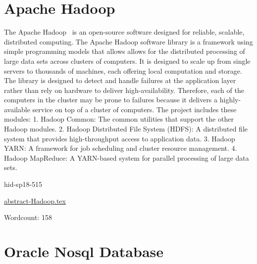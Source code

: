 \section{Apache Hadoop}

The Apache Hadoop~\cite{hid-sp18-515-www-hadoop} is an open-source 
software designed for reliable, scalable, distributed computing. 
The Apache Hadoop software library is a framework using simple programming 
models that allows allows for the distributed processing of large data sets across clusters of computers.
It is designed to scale up from single servers to thousands of machines, 
each offering local computation and storage.
The library is designed to detect and handle failures at the application 
layer rather than rely on hardware to deliver high-availability.
Therefore, each of the computers in the cluster may be prone to failures 
because it delivers a highly-available service on top of a cluster of computers. 
The project includes these modules:
1. Hadoop Common:
The common utilities that support the other Hadoop modules.
2. Hadoop Distributed File System (HDFS):
A distributed file system that provides high-throughput access to 
application data.
3. Hadoop YARN:
A framework for job scheduling and cluster resource management. 
4. Hadoop MapReduce: 
A YARN-based system for parallel processing of large data sets.


\begin{IU}

hid-sp18-515

\href{https://github.com/cloudmesh-community/hid-sp18-515/blob/master//technology/abstract-Hadoop.tex}{abstract-Hadoop.tex}

 

Wordcount: 158

\end{IU}

\section{Oracle Nosql Database}

